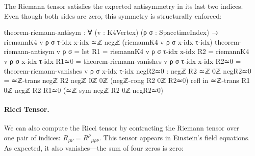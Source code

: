 \documentclass[11pt,a4paper]{book}
\begin{document}
The Riemann tensor satisfies the expected antisymmetry in its last two indices. Even though 
both sides are zero, this symmetry is structurally enforced:

\begin{code}
theorem-riemann-antisym : ∀ (v : K4Vertex) (ρ σ : SpacetimeIndex) →
                          riemannK4 v ρ σ τ-idx x-idx ≃ℤ negℤ (riemannK4 v ρ σ x-idx τ-idx)
theorem-riemann-antisym v ρ σ = 
  let R1 = riemannK4 v ρ σ τ-idx x-idx
      R2 = riemannK4 v ρ σ x-idx τ-idx
      R1≃0 = theorem-riemann-vanishes v ρ σ τ-idx x-idx
      R2≃0 = theorem-riemann-vanishes v ρ σ x-idx τ-idx
      negR2≃0 : negℤ R2 ≃ℤ 0ℤ
      negR2≃0 = ≃ℤ-trans {negℤ R2} {negℤ 0ℤ} {0ℤ} (negℤ-cong {R2} {0ℤ} R2≃0) refl
  in ≃ℤ-trans {R1} {0ℤ} {negℤ R2} R1≃0 (≃ℤ-sym {negℤ R2} {0ℤ} negR2≃0)
\end{code}

\paragraph{Ricci Tensor.}

We can also compute the Ricci tensor by contracting the Riemann tensor over one pair of 
indices: $R_{\mu\nu} = R^\rho{}_{\mu\rho\nu}$. This tensor appears in Einstein's field 
equations. As expected, it also vanishes—the sum of four zeros is zero:
\end{document}
